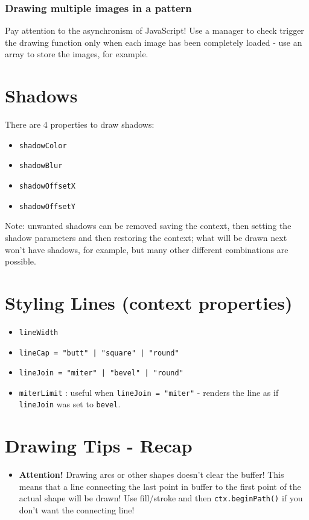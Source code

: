 \documentclass[a4paper,11pt]{book}
\begin{document}
\subsubsection{Drawing multiple images in a pattern}
Pay attention to the asynchronism of JavaScript! Use a manager to check trigger the drawing function only when each
image has been completely loaded - use an array to store the images, for example.

\section{Shadows}
There are 4 properties to draw shadows:
\begin{itemize}
\item \texttt{shadowColor}
\item \texttt{shadowBlur}
\item \texttt{shadowOffsetX}
\item \texttt{shadowOffsetY}
\end{itemize}
Note: unwanted shadows can be removed saving the context, then setting the shadow parameters and then restoring the context;
what will be drawn next won't have shadows, for example, but many other different combinations are possible.

\section{Styling Lines (context properties)}
\begin{itemize}
\item \texttt{lineWidth}
\item \texttt{lineCap = "butt" | "square" | "round"}
\item \texttt{lineJoin = "miter" | "bevel" | "round"}
\item \texttt{miterLimit} : useful when \texttt{lineJoin = "miter"} - renders the
line as if \texttt{lineJoin} was set to \texttt{bevel}.
\end{itemize}

\section{Drawing Tips - Recap}
\begin{itemize}
\item \textbf{Attention!} Drawing arcs or other shapes
	  doesn't clear the buffer! This means that a line connecting the last point in buffer to the first point
	  of the actual shape will be drawn! Use fill/stroke and then \texttt{ctx.beginPath()} if you don't want the connecting
	  line!
\end{itemize}
\end{document}
